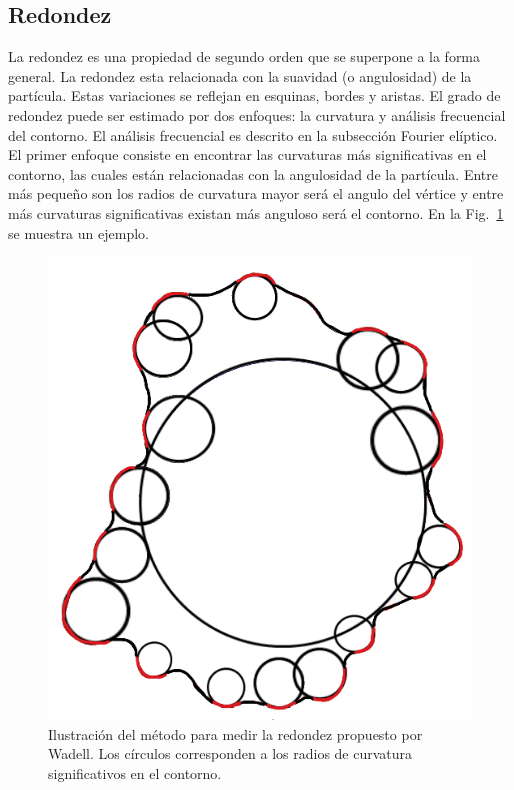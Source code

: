 \documentclass[conference]{IEEEtran}
\begin{document}
\subsection{Redondez}
La redondez es una propiedad de segundo orden que se superpone a la forma general. La redondez esta relacionada con la suavidad (o angulosidad) de la partícula. Estas variaciones se reflejan en esquinas, bordes y aristas. El grado de redondez puede ser estimado por dos enfoques: la curvatura y análisis frecuencial del contorno. El análisis frecuencial es descrito en la subsección Fourier elíptico. El primer enfoque consiste en encontrar las curvaturas más significativas en el contorno, las cuales están relacionadas con la angulosidad de la partícula. Entre más pequeño son los radios de curvatura mayor será el angulo del vértice y entre más curvaturas significativas existan más anguloso será el contorno.  En la Fig.~\ref{fig2} se muestra un ejemplo.



\begin{figure}[htbp]
\centerline{\includegraphics[scale=0.4]{fig2.png}}
\caption{Ilustración del método para medir la redondez propuesto por Wadell. Los círculos corresponden a los radios de curvatura significativos en el contorno.}
\label{fig2}
\end{figure}
\end{document}
